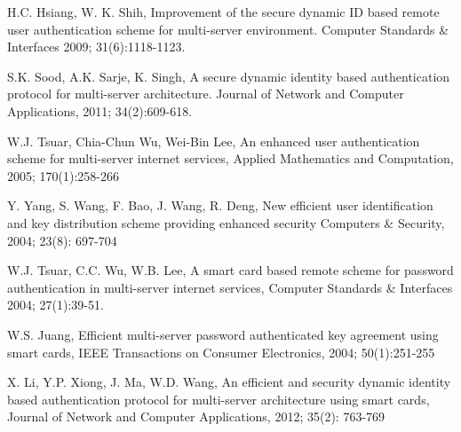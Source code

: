 \documentclass[preprint,12pt]{elsarticle}
\begin{document}
\begin{thebibliography}{33}
H.C. Hsiang, W. K. Shih, Improvement of the secure dynamic ID based remote user authentication scheme for multi-server environment. Computer Standards \& Interfaces 2009; 31(6):1118-1123.

S.K. Sood, A.K. Sarje, K. Singh, A secure dynamic identity based authentication protocol for multi-server architecture. Journal of Network and Computer Applications, 2011; 34(2):609-618.

W.J. Tsuar, Chia-Chun Wu, Wei-Bin Lee, An enhanced user authentication scheme for multi-server internet services, Applied Mathematics and Computation, 2005; 170(1):258-266

Y. Yang, S. Wang, F. Bao, J. Wang, R. Deng, New efficient user identification and key distribution scheme providing enhanced security
Computers \& Security, 2004; 23(8): 697-704

W.J. Tsuar, C.C. Wu, W.B. Lee, A smart card based remote scheme for password authentication in multi-server internet services, Computer Standards \& Interfaces 2004; 27(1):39-51.

W.S. Juang, Efficient multi-server password authenticated key agreement using smart cards, IEEE Transactions on  Consumer Electronics, 2004; 50(1):251-255

X. Li, Y.P. Xiong, J. Ma, W.D. Wang, An efficient and security dynamic identity based authentication protocol for multi-server architecture using smart cards, Journal of Network and Computer Applications, 2012; 35(2): 763-769
\end{thebibliography}
\end{document}
